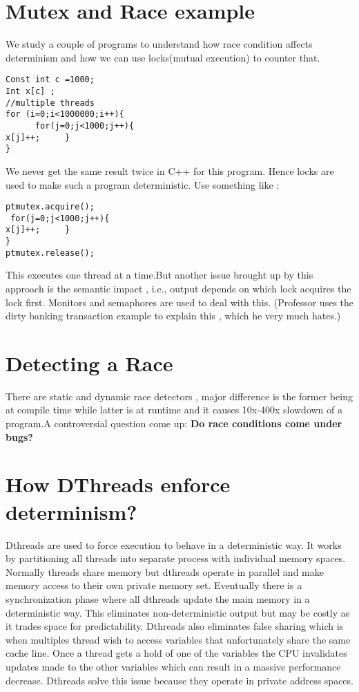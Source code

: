 \documentclass[twoside]{article}
\begin{document}
\section{Mutex and Race example}
We study a couple of programs to understand how race condition affects determinism and how we can use locks(mutual execution) to counter that.
\begin{verbatim}
Const int c =1000;
Int x[c] ;
//multiple threads
for (i=0;i<1000000;i++){
      for(j=0;j<1000;j++){
x[j]++; 	}
}
\end{verbatim}
We never get the same result twice in C++ for this program.
Hence locks are used to make such a program deterministic. Use something like :
\begin{verbatim}
ptmutex.acquire();
 for(j=0;j<1000;j++){
x[j]++; 	}
}
ptmutex.release();
\end{verbatim}
This executes one thread at a time.But another issue brought up by this approach is the semantic impact , i.e., output depends on which lock acquires the lock first.
Monitors and semaphores are used to deal with this. (Professor uses the dirty banking transaction example to explain this , which he very much hates.)

\section{Detecting a Race}
There are static and dynamic race detectors , major difference is the former being at compile time while latter is at runtime and it causes 10x-400x slowdown of a program.A controversial question come up: \textbf{Do race conditions come under bugs?}

\section{How DThreads enforce determinism?}
Dthreads are used to force execution to behave in a deterministic way. It works by partitioning all threads into separate process with individual memory spaces. Normally threads share memory but dthreads operate in parallel and make memory access to their own private memory set. Eventually there is a synchronization phase where all dthreads update the main memory in a deterministic way. This eliminates non-deterministic output but may be costly as it trades space for predictability. Dthreads also eliminates false sharing which is when multiples thread wish to access variables that unfortunately share the same cache line. Once a thread gets a hold of one of the variables the CPU invalidates updates made to the other variables which can result in a massive performance decrease. Dthreads solve this issue because they operate in private address spaces.
\end{document}
